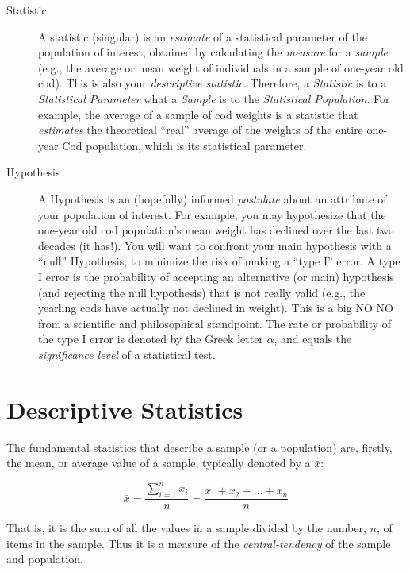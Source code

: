 \begin{description}
		\item[Statistic] A statistic (singular) is an {\it estimate} of a 
		statistical parameter of the population of interest, obtained by 
		calculating the {\it measure} for a {\it sample} (e.g.,  the 
		average or mean weight of individuals in a sample of one-year old 
		cod). This is also your {\it descriptive statistic}. Therefore, a 
		{\it Statistic} is to a {\it Statistical Parameter} what a {\it 
		Sample} is to the {\it Statistical Population}. For example, the 
		average of a sample of cod weights is a statistic that {\it 
		estimates} the theoretical ``real'' average of the weights of the 
		entire one-year Cod population, which is its statistical parameter.
    
		\item[Hypothesis] A Hypothesis is an (hopefully) informed {\it 
		postulate} about an attribute of your population of interest. For 
		example, you may hypothesize that the one-year old cod population's 
		mean weight has declined over the last two decades (it has!). You 
		will want to confront your main hypothesis with a ``null'' 
		Hypothesis, to minimize the risk of making a ``type I'' error. A 
		type I error is the probability of accepting an alternative (or 
		main) hypothesis (and rejecting the null hypothesis) that is not 
		really valid (e.g., the yearling cods have actually not declined in 
		weight). This is a big NO NO from a scientific and philosophical 
		standpoint. The rate or probability of the type I error is denoted 
		by the Greek letter $\alpha$, and equals the {\it significance 
		level} of a statistical test.

\end{description}

\section{Descriptive Statistics}

The fundamental statistics that describe a sample (or a population) 
are, firstly, the mean, or average value of a sample, typically denoted 
by a $\bar{x}$: 

\begin{equation}
	\bar{x} =  \frac{\sum\limits_{i=1}^n x_i}{n} = \frac{x_{1} + x_{2} + \dots +x_{n}}{n}
\end{equation}

That is, it is the sum of all the values in a sample divided by the 
number, $n$, of items in the sample. Thus it is a measure of the {\it 
central-tendency} of the sample and population.

